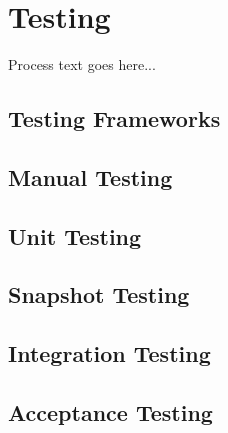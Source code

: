 \section{Testing}
Process text goes here...
\subsection{Testing Frameworks}
\subsection{Manual Testing}
\subsection{Unit Testing}
\subsection{Snapshot Testing}
\subsection{Integration Testing}
\subsection{Acceptance Testing}